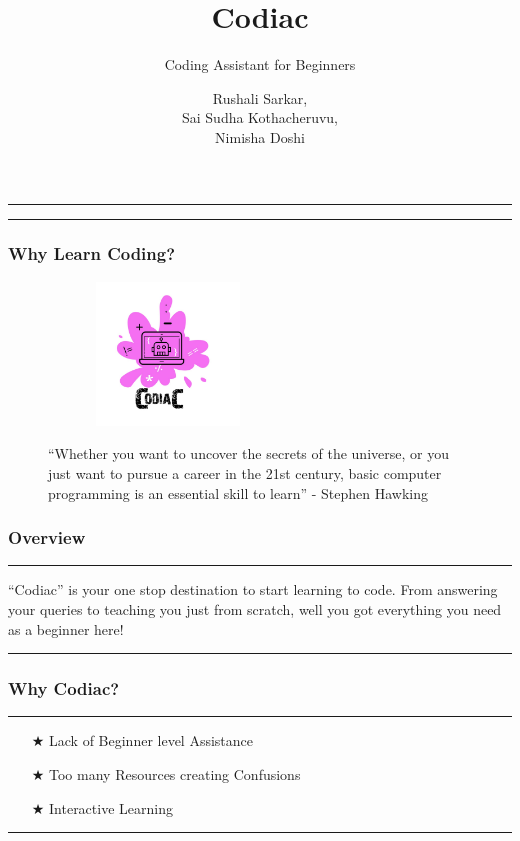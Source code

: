\documentclass[14pt]{beamer}
\title[Codiac]{Codiac}
\subtitle[Coding Assitant]{Coding Assistant for Beginners}
\author[Team 2]{Rushali Sarkar, \\ Sai Sudha Kothacheruvu, \\ Nimisha Doshi}
\begin{document}
\begin{frame}
    \noindent
    {\color{pink} \rule{\linewidth}{0.7mm} }
    \titlepage
    \noindent
    {\color{pink} \rule{\linewidth}{0.7mm} }
\end{frame}


\begin{frame}
    \frametitle{Why Learn Coding?}
    \begin{figure}[htbp]
        \centerline{\includegraphics[width=2.5in, height=1.5in]{./logos/logo.jpeg}}
        \begin{spacing}{0.25}
        {\small 
        ``Whether you want to uncover the secrets of the universe, 
        or you just want to pursue a career in the 21st century, 
        basic computer programming is an essential skill to learn'' 
        \linebreak - Stephen Hawking}
        \end{spacing}
    \end{figure}
\end{frame}


\begin{frame}
    \frametitle{Overview}
    \noindent
    {\color{pink} \rule{\linewidth}{0.7mm} }
    ``Codiac'' is your one stop destination to start learning to code. From answering your queries to teaching you just from scratch, well you got everything you need as a beginner here!
    \noindent
    {\color{pink} \rule{\linewidth}{0.7mm} }
\end{frame}

\begin{frame}
    \frametitle{Why Codiac?}
    \noindent
    {\color{pink} \rule{\linewidth}{0.7mm} }
    \begin{itemize}
    \item [$\bigstar$] Lack of Beginner level Assistance \\
        \pause
    \item [$\bigstar$] Too many Resources creating Confusions \\
        \pause
   \item [$\bigstar$] Interactive Learning \\
    \end{itemize}
    \noindent
     {\color{pink} \rule{\linewidth}{0.7mm}}
\end{frame}
\end{document}
